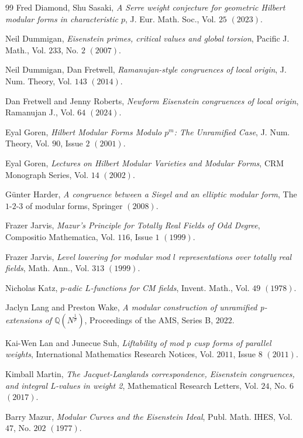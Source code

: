 \begin{thebibliography}{99}
Fred Diamond, Shu Sasaki, \emph{A Serre weight conjecture for geometric Hilbert modular forms in characteristic $p$}, J. Eur. Math. Soc., Vol. $25$ $(2023)$.

Neil Dummigan, \emph{Eisenstein primes, critical values and global torsion}, Pacific J. Math., Vol. $233$, No. $2$ $(2007)$.

Neil Dummigan, Dan Fretwell, \emph{Ramanujan-style congruences of local origin}, J. Num. Theory, Vol. $143$ $(2014)$.

Dan Fretwell and Jenny Roberts, \emph{Newform Eisenstein congruences of local origin}, Ramanujan J., Vol. $64$ $(2024)$.

Eyal Goren, \emph{Hilbert Modular Forms Modulo $p^m$: The Unramified Case}, J. Num. Theory, Vol. $90$, Issue $2$ $(2001)$.

Eyal Goren, \emph{Lectures on Hilbert Modular Varieties and Modular Forms}, CRM Monograph Series, Vol. $14$ $(2002)$.

G\"unter Harder, \emph{A congruence between a {S}iegel and an elliptic modular form}, The $1$-$2$-$3$ of modular forms, Springer $(2008)$.

Frazer Jarvis, \emph{Mazur's Principle for Totally Real Fields of Odd Degree}, Compositio Mathematica, Vol. $116$, Issue $1$ $(1999)$.

Frazer Jarvis, \emph{Level lowering for modular mod $l$ representations over totally real fields}, Math. Ann., Vol. $313$ $(1999)$.

Nicholas Katz, \emph{$p$-adic $L$-functions for CM fields}, Invent. Math., Vol. $49$ $(1978)$.

Jaclyn Lang and Preston Wake, \emph{A modular construction of unramified p-extensions of $\mathbb{Q}(N^{\frac{1}{p}})$}, Proceedings of the AMS, Series B, $2022$.

Kai-Wen Lan and Junecue Suh, \emph{Liftability of mod $p$ cusp forms of parallel weights}, International Mathematics Research Notices, Vol. $2011$, Issue $8$ $(2011)$.

Kimball Martin, \emph{The Jacquet-Langlands correspondence, Eisenstein congruences, and integral L-values in weight 2}, Mathematical Research Letters, Vol. $24$, No. $6$ $(2017)$.

Barry Mazur, \emph{Modular Curves and the Eisenstein Ideal}, Publ. Math. IHES, Vol. $47$, No. $202$ $(1977)$.


\end{thebibliography}
